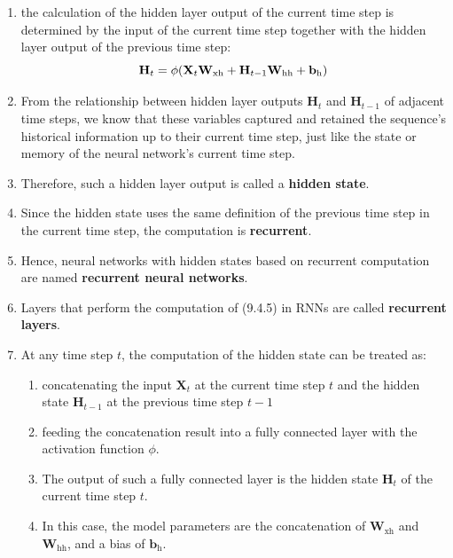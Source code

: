 \begin{enumerate}
    \item the calculation of the hidden layer output of the current time step is determined by the input of the current time step together with the hidden layer output of the previous time step:
    \[
        \hfill
        \mathbf{H}_t = \phi(\mathbf{X}_t \mathbf{W}_{\textrm{xh}} + \mathbf{H}_{t-1} \mathbf{W}_{\textrm{hh}}  + \mathbf{b}_\textrm{h})
        \hfill
    \]

    \item From the relationship between hidden layer outputs $\mathbf{H}_t$ and $\mathbf{H}_{t-1}$ of adjacent time steps, we know that these variables captured and retained the sequence’s historical information up to their current time step, just like the state or memory of the neural network’s current time step.

    \item Therefore, such a hidden layer output is called a \textbf{hidden state}. 
            
    \item Since the hidden state uses the same definition of the previous time step in the current time step, the computation is \textbf{recurrent}. 
    
    \item Hence, neural networks with hidden states based on recurrent computation are named \textbf{recurrent neural networks}. 
    
    \item Layers that perform the computation of (9.4.5) in RNNs are called \textbf{recurrent layers}.

    \item At any time step $t$, the computation of the hidden state can be treated as: 
    \begin{enumerate}
        \item concatenating the input $\mathbf{X}_t$ at the current time step $t$ and the hidden state $\mathbf{H}_{t-1}$ at the previous time step $t-1$

        \item feeding the concatenation result into a fully connected layer with the activation function $\phi$.
        
        \item The output of such a fully connected layer is the hidden state $\mathbf{H}_t$ of the current time step $t$. 
        
        \item In this case, the model parameters are the concatenation of $\mathbf{W}_{\textrm{xh}}$ and $\mathbf{W}_{\textrm{hh}}$, and a bias of $\mathbf{b}_\textrm{h}$.


\end{enumerate}
\end{enumerate}
